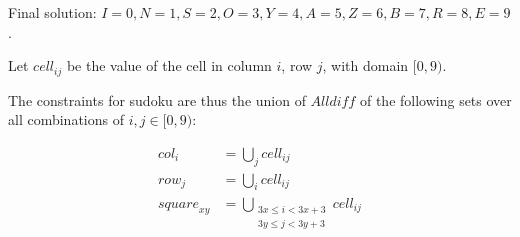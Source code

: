 \documentclass[12pt]{article}
\begin{document}
Final solution: $I = 0, N = 1, S = 2, O = 3, Y = 4, A = 5, Z = 6, B = 7, R = 8, E = 9$.


\problemasub

\problemasub

\problemsub

Let $\textit{cell}_{ij}$ be the value of the cell in column $i$, row $j$, with domain $[0, 9)$.

    The constraints for sudoku are thus the union of $\textit{Alldiff}$ of the following sets over all combinations of $i, j \in [0, 9)$:

\begin{align*}
    \textit{col}_i &= \bigcup_j \textit{cell}_{ij} \\
    \textit{row}_j &= \bigcup_i \textit{cell}_{ij} \\
    \textit{square}_{xy} &= \bigcup_{\substack{3x \leq i < 3x+3 \\ 3y \leq j < 3y+3}}{\textit{cell}_{ij}}
\end{align*}
\end{document}
